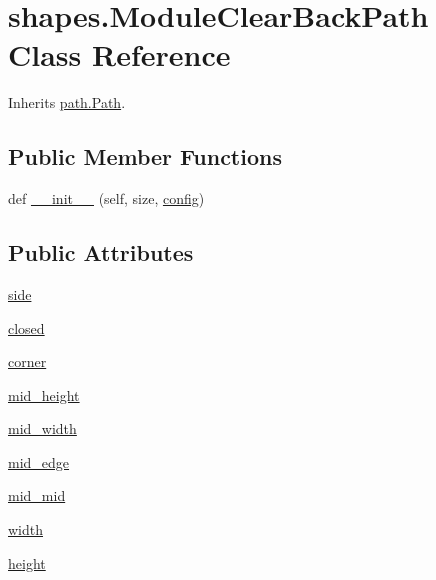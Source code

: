 \hypertarget{classshapes_1_1_module_clear_back_path}{}\section{shapes.\+Module\+Clear\+Back\+Path Class Reference}
\label{classshapes_1_1_module_clear_back_path}


Inherits \hyperlink{classpath_1_1_path}{path.\+Path}.

\subsection*{Public Member Functions}
\begin{DoxyCompactItemize}
\item 
def \hyperlink{classshapes_1_1_module_clear_back_path_a1684f9245c5dc4169aed51ebdde6f6a2}{\+\_\+\+\_\+init\+\_\+\+\_\+} (self, size, \hyperlink{classpath_1_1_path_a889e352f02dba833077975ce855276ed}{config})
\end{DoxyCompactItemize}
\subsection*{Public Attributes}
\begin{DoxyCompactItemize}
\item 
\hyperlink{classshapes_1_1_module_clear_back_path_ae9b4de4bb691ca879b444b0ef8a56f09}{side}
\item 
\hyperlink{classshapes_1_1_module_clear_back_path_a12fc0d332c9d61f38d7b7672c6cbabbf}{closed}
\item 
\hyperlink{classshapes_1_1_module_clear_back_path_a1cc6c6001d2f1161ce8cdc95dcac3a15}{corner}
\item 
\hyperlink{classshapes_1_1_module_clear_back_path_a374965179b9890f2c6aa124f84e6eaac}{mid\+\_\+height}
\item 
\hyperlink{classshapes_1_1_module_clear_back_path_aa3cf5e734ca237d66bcb547d069f12b3}{mid\+\_\+width}
\item 
\hyperlink{classshapes_1_1_module_clear_back_path_ae0b07466eafd64881149c3615309fa36}{mid\+\_\+edge}
\item 
\hyperlink{classshapes_1_1_module_clear_back_path_a8b42577e0da207b9898189e1e4aa8223}{mid\+\_\+mid}
\item 
\hyperlink{classshapes_1_1_module_clear_back_path_aa57e0254bc676db2ca4999168d7b568c}{width}
\item 
\hyperlink{classshapes_1_1_module_clear_back_path_a456184c8cd3b1a322564e8b04acc35c7}{height}
\end{DoxyCompactItemize}
